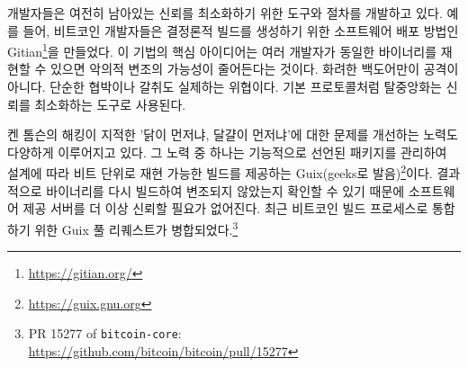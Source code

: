 \begin{comment}
	Developers are working on tools and procedures to minimize any remaining trust
	even further. For example, Bitcoin developers created
	Gitian\footnote{\url{https://gitian.org/}}, which is a software distribution
	method to create deterministic builds. The idea is that if multiple developers
	are able to reproduce identical binaries, the chance of malicious tampering is
	reduced. Fancy backdoors aren't the only attack vector. Simple blackmail or
	extortion are real threats as well. As in the main protocol, decentralization is
	used to minimize trust.
\end{comment}
개발자들은 여전히 남아있는 신뢰를 최소화하기 위한 도구와 절차를 개발하고 있다.
예를 들어, 비트코인 개발자들은 결정론적 빌드를 생성하기 위한 소프트웨어 배포 방법인 Gitian\footnote{\url{https://gitian.org/}}을 만들었다.
이 기법의 핵심 아이디어는 여러 개발자가 동일한 바이너리를 재현할 수 있으면 악의적 변조의 가능성이 줄어든다는 것이다.
화려한 백도어만이 공격이 아니다. 단순한 협박이나 갈취도 실제하는 위협이다. 
기본 프로토콜처럼 탈중앙화는 신뢰를 최소화하는 도구로 사용된다. 

\begin{comment}
	Various efforts are being made to improve upon the chicken-and-egg problem of
	bootstrapping which Ken Thompson's hack so brilliantly pointed
	out~\cite{web:bootstrapping}. One such effort is
	Guix\footnote{\url{https://guix.gnu.org}} (pronounced \textit{geeks}), which
	uses functionally declared package management leading to bit-for-bit
	reproducible builds by design. The result is that you don't have to trust any
	software-providing servers anymore since you can verify that the served binary
	was not tampered with by rebuilding it from scratch. Recently, a
	pull-request was merged to integrate Guix into the Bitcoin build process.\footnote{See PR 15277 of \texttt{bitcoin-core}: \\ \url{https://github.com/bitcoin/bitcoin/pull/15277}}
\end{comment}
켄 톰슨의 해킹이 지적한 '닭이 먼저냐, 달걀이 먼저냐'에 대한 문제를 개선하는 노력도 다양하게 이루어지고 있다.\cite{web:bootstrapping}
그 노력 중 하나는 기능적으로 선언된 패키지를 관리하여 설계에 따라 비트 단위로 재현 가능한 빌드를 제공하는 Guix(geeks로 발음)\footnote{\url{https://guix.gnu.org}}이다.
결과적으로 바이너리를 다시 빌드하여 변조되지 않았는지 확인할 수 있기 때문에 소프트웨어 제공 서버를 더 이상 신뢰할 필요가 없어진다.
최근 비트코인 빌드 프로세스로 통합하기 위한 Guix 풀 리퀘스트가 병합되었다.\footnote{PR 15277 of \texttt{bitcoin-core}: \\ \url{https://github.com/bitcoin/bitcoin/pull/15277}}

